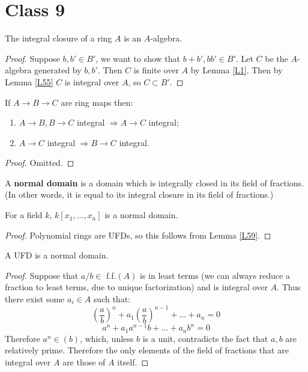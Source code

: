 \documentclass{../mathnotes}
\begin{document}
\section*{Class 9}
\begin{lem}
\label{L56}
The integral closure of a ring $A$ is an $A$-algebra.
\end{lem}
\begin{proof}
Suppose $b,b' \in B'$, we want to show that $b+b', bb' \in B'$. Let $C$ be the $A$-algebra generated by $b,b'$. Then $C$ is finite over $A$ by Lemma \ref{L1}. Then by Lemma \ref{L55} $C$ is integral over $A$, so $C\subset B'$.
\end{proof}

\begin{lem}
\label{L57}
If $A\to B \to C$ are ring maps then:
\begin{enumerate}
\item $A\to B, B\to C$ integral $\Rightarrow A\to C$ integral;
\item $A\to C$ integral $\Rightarrow B\to C$ integral.
\end{enumerate}
\end{lem}
\begin{proof}
Omitted.
\end{proof}

\begin{defn}
A \textbf{normal domain} is a domain which is integrally closed in its field of fractions. (In other words, it is equal to its integral closure in its field of fractions.)
\end{defn}

\begin{lem}
\label{L58}
For a field $k$, $k[x_1, \dots, x_n]$ is a normal domain.
\end{lem}
\begin{proof}
Polynomial rings are UFDs, so this follows from Lemma \ref{L59}.
\end{proof}

\begin{lem}
\label{L59}
A UFD is a normal domain.
\end{lem}
\begin{proof}
Suppose that $a/b \in$ f.f.$(A)$ is in least terms (we can always reduce a fraction to least terms, due to unique factorization) and is integral over $A$. Thus there exist some $a_i \in A$ such that:
\[         \left( \frac{a}{b} \right)^n +  a_1 \left( \frac{a}{b} \right)^{n-1} + \dots + a_n = 0       \]
\[       a^n + a_1 a^{n-1} b + \dots + a_n b^n = 0    \]
Therefore $a^n \in (b)$, which, unless $b$ is a unit, contradicts the fact that $a, b$ are relatively prime. Therefore the only elements of the field of fractions that are integral over $A$ are those of $A$ itself.
\end{proof}
\end{document}
